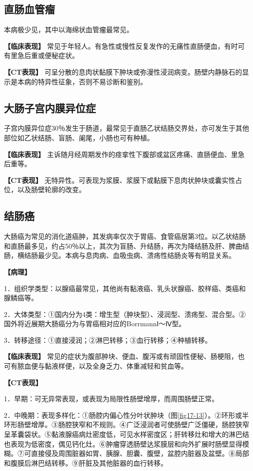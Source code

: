 \subsection{直肠血管瘤}

本病极少见，其中以海绵状血管瘤最常见。

\textbf{【临床表现】}
常见于年轻人。有急性或慢性反复发作的无痛性直肠便血，有时可有里急后重或便秘症状。

\textbf{【CT表现】}
可呈分散的息肉状黏膜下肿块或弥漫性浸润病变。肠壁内静脉石的显示是本病的特异性征象，否则不易诊断和鉴别。

\subsection{大肠子宫内膜异位症}

子宫内膜异位症30％发生于肠道，最常见于直肠乙状结肠交界处，亦可发生于其他部位如乙状结肠、盲肠、阑尾，小肠也可有种植。

\textbf{【临床表现】}
主诉随月经周期发作的痉挛性下腹部或盆区疼痛、直肠便血、里急后重等。

\textbf{【CT表现】}
无特异性。可表现为浆膜、浆膜下或黏膜下息肉状肿块或囊实性占位，以及肠壁轮廓的改变。

\subsection{结肠癌}

大肠癌为常见的消化道癌肿，其发病率仅次于胃癌、食管癌居第3位。以乙状结肠和直肠最多见，约占50％以上，其次为盲肠、升结肠，再次为降结肠及肝、脾曲结肠，横结肠最少见。本病与息肉病、血吸虫病、溃疡性结肠炎等有明显关系。

\textbf{【病理】}

1．组织学类型：以腺癌最常见，其他尚有黏液癌、乳头状腺癌、胶样癌、类癌和腺鳞癌等。

2．大体类型：①国内分为4类：增生型（肿块型）、浸润型、溃疡型、混合型。②国外将近展期大肠癌分为与胃癌相对应的BorrmannⅠ～Ⅳ型。

3．转移途径：①直接浸润；②淋巴转移；③血行转移；④种植转移。

\textbf{【临床表现】}
常见的症状为腹部肿块、便血、腹泻或有顽固性便秘、肠梗阻，也可有脓血便与黏液样便，以及全身乏力、体重减轻和贫血等。

\textbf{【CT表现】}

1．早期：可无异常表现，或表现为局限性肠壁增厚，而周围肠壁正常。

2．中晚期：表现多样化：①肠腔内偏心性分叶状肿块（图\ref{fig17-13}）。②环形或半环形肠壁增厚。③肠腔狭窄和不规则。④广泛浸润者可使肠壁广泛僵硬，肠腔狭窄呈革囊袋状。⑤黏液腺癌病灶密度低，可见水样密度区；肝转移灶和增大的淋巴结也表现为低密度，偶见钙化灶。⑥肿瘤穿透肠壁达浆膜层和向外扩展时肠壁显得模糊。⑦可直接侵及周围脏器如胃、胰腺、胆囊、腹壁，盆腔内脏器及盆壁。⑧局部和腹膜后淋巴结转移。⑨肝脏及其他脏器的血行转移。

